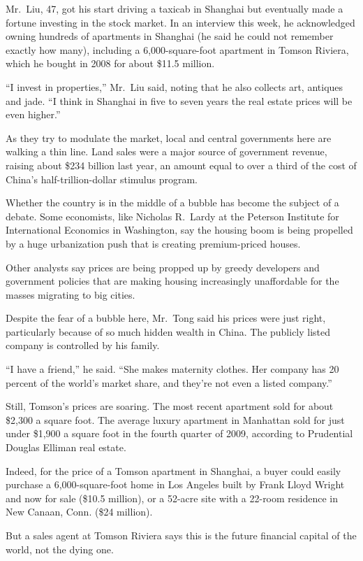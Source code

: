 ﻿\documentclass[12pt]{article}
\begin{document}
Mr.~Liu, 47, got his start driving a taxicab in Shanghai but eventually made a fortune investing in
the stock market. In an interview this week, he acknowledged owning hundreds of apartments in
Shanghai (he said he could not remember exactly how many), including a 6,000-square-foot apartment
in Tomson Riviera, which he bought in 2008 for about \$11.5 million.

``I invest in properties,'' Mr.~Liu said, noting that he also collects art, antiques and jade. ``I
think in Shanghai in five to seven years the real estate prices will be even higher.''

As they try to modulate the market, local and central governments here are walking a thin line. Land
sales were a major source of government revenue, raising about \$234 billion last year, an amount
equal to over a third of the cost of China's half-trillion-dollar stimulus program.

Whether the country is in the middle of a bubble has become the subject of a debate. Some
economists, like Nicholas R.~Lardy at the Peterson Institute for International Economics in
Washington, say the housing boom is being propelled by a huge urbanization push that is creating
premium-priced houses.

Other analysts say prices are being propped up by greedy developers and government policies that are
making housing increasingly unaffordable for the masses migrating to big cities.

Despite the fear of a bubble here, Mr.~Tong said his prices were just right, particularly because of
so much hidden wealth in China. The publicly listed company is controlled by his family.

``I have a friend,'' he said. ``She makes maternity clothes. Her company has 20 percent of the
world's market share, and they're not even a listed company.''

Still, Tomson's prices are soaring. The most recent apartment sold for about \$2,300 a square foot.
The average luxury apartment in Manhattan sold for just under \$1,900 a square foot in the fourth
quarter of 2009, according to Prudential Douglas Elliman real estate.

Indeed, for the price of a Tomson apartment in Shanghai, a buyer could easily purchase a
6,000-square-foot home in Los Angeles built by Frank Lloyd Wright and now for sale (\$10.5 million),
or a 52-acre site with a 22-room residence in New Canaan, Conn. (\$24 million).

But a sales agent at Tomson Riviera says this is the future financial capital of the world, not the
dying one.
\end{document}
